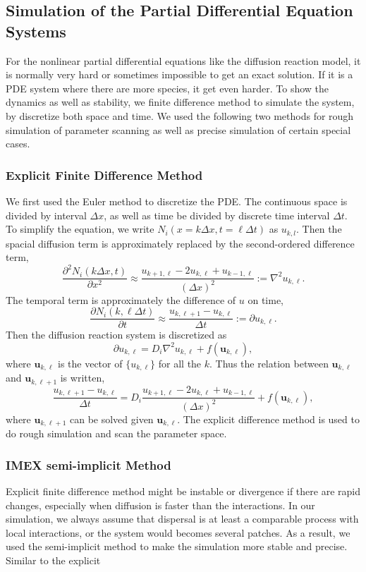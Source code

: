 \subsection{Simulation of the Partial Differential Equation Systems} For the nonlinear partial differential equations like the diffusion reaction model, it is normally very hard or sometimes impossible to get an exact solution. If it is a PDE system where there are more species, it get even harder. To show the dynamics as well as stability, we finite difference method to simulate the system, by discretize both space and time. We used the following two methods for rough simulation of parameter scanning as well as precise simulation of certain special cases. \subsubsection{Explicit Finite Difference Method} We first used the Euler method to discretize the PDE. The continuous space is divided by interval $\Delta x$, as well as time be divided by discrete time interval $\Delta t$. To simplify the equation, we write $N_{i}(x = k\Delta x, t = \ell \Delta t)$ as $u_{k,l}$. Then the spacial diffusion term is approximately replaced by the second-ordered difference term, \begin{equation*} \frac{\partial^2 N_i(k \Delta x,t)}{\partial x^2} \approx \frac{u_{k+1,\ell} - 2 u_{k,\ell} + u_{k-1,\ell}}{(\Delta x)^2} := \nabla^2 u_{k,\ell}. \end{equation*} The temporal term is approximately the difference of $u$ on time, \begin{equation*} \frac{\partial N_i(k, \ell \Delta t)}{\partial t} \approx \frac{u_{k,\ell+1} - u_{k,\ell}}{\Delta t} := \partial u_{k,\ell}. \end{equation*} Then the diffusion reaction system is discretized as \begin{equation} \partial u_{k,\ell} = D_{i} \nabla^2 u_{k,\ell} + f(\mathbf{u}_{k,\ell}), \end{equation} where $\mathbf{u}_{k,\ell}$ is the vector of $\{ u_{k,\ell} \}$ for all the $k$. Thus the relation between $\mathbf{u}_{k,\ell}$ and $\mathbf{u}_{k,\ell+1}$ is written, \begin{equation*} \frac{u_{k,\ell+1} - u_{k,\ell}}{\Delta t} = D_{i} \frac{u_{k+1,\ell} - 2 u_{k,\ell} + u_{k-1,\ell}}{(\Delta x)^2} + f(\mathbf{u}_{k,\ell}), \end{equation*} where $\mathbf{u}_{k,\ell+1}$ can be solved given $\mathbf{u}_{k,\ell}$. The explicit difference method is used to do rough simulation and scan the parameter space. \subsubsection{IMEX semi-implicit Method} Explicit finite difference method might be instable or divergence if there are rapid changes, especially when diffusion is faster than the interactions. In our simulation, we always assume that dispersal is at least a comparable process with local interactions, or the system would becomes several patches. As a result, we used the semi-implicit method to make the simulation more stable and precise. Similar to the explicit 